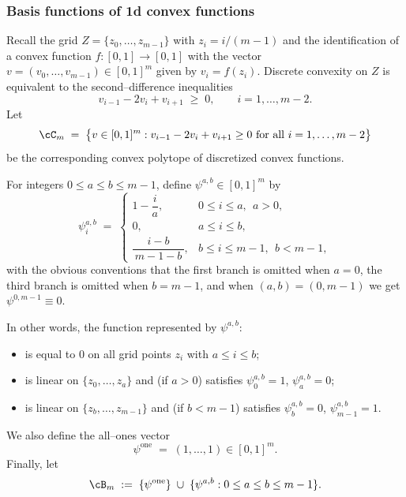 \subsubsection{Basis functions of 1d convex functions}
Recall the grid $Z=\{z_0,\dots,z_{m-1}\}$ with $z_i = i/(m-1)$ and the identification
of a convex function $f:[0,1]\to[0,1]$ with the vector
$v=(v_0,\dots,v_{m-1})\in[0,1]^m$ given by $v_i=f(z_i)$.
Discrete convexity on $Z$ is equivalent to the second–difference inequalities
\[
    v_{i-1} - 2v_i + v_{i+1} \;\ge\; 0,
    \qquad i=1,\dots,m-2.
\]
Let
\[
    \cC_m
    \;=\;
    \bigl\{
    v\in[0,1]^m:
    v_{i-1}-2v_i+v_{i+1}\ge 0 \text{ for all } i=1,\dots,m-2
    \bigr\}
\]
be the corresponding convex polytope of discretized convex functions.

\begin{definition}
    For integers $0\le a\le b\le m-1$, define $\psi^{a,b}\in[0,1]^m$ by
    \begin{equation*}
        \psi^{a,b}_i
        \;=\;
        \begin{cases}
            1 - \dfrac{i}{a},       & 0\le i\le a,\ \ a>0,     \\[6pt]
            0,                      & a\le i\le b,             \\[6pt]
            \dfrac{i-b}{\,m-1-b\,}, & b\le i\le m-1,\ \ b<m-1,
        \end{cases}
    \end{equation*}
    with the obvious conventions that the first branch is omitted when $a=0$, the
    third branch is omitted when $b=m-1$, and when $(a,b)=(0,m-1)$ we get
    $\psi^{0,m-1}\equiv 0$.

    In other words, the function represented by $\psi^{a,b}$:
    \begin{itemize}
        \item is equal to $0$ on all grid points $z_i$ with $a\le i\le b$;
        \item is linear on $\{z_0,\dots,z_a\}$ and (if $a>0$) satisfies
              $\psi^{a,b}_0=1$, $\psi^{a,b}_a=0$;
        \item is linear on $\{z_b,\dots,z_{m-1}\}$ and (if $b<m-1$) satisfies
              $\psi^{a,b}_b=0$, $\psi^{a,b}_{m-1}=1$.
    \end{itemize}
    We also define the all–ones vector
    \[
        \psi^{\mathrm{one}} \;=\; (1,\dots,1) \in [0,1]^m.
    \]
    Finally, let
    \[
        \cB_m
        \;:=\;
        \{\psi^{\mathrm{one}}\}
        \;\cup\;
        \{\psi^{a,b}: 0\le a\le b\le m-1\}.
    \]
\end{definition}

